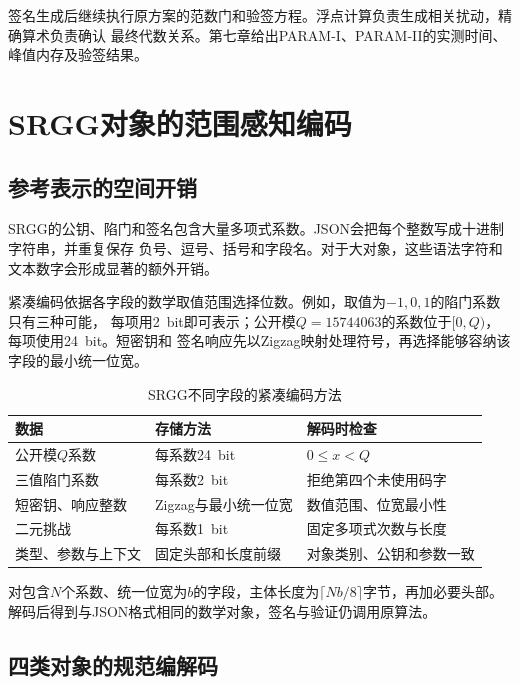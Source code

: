 签名生成后继续执行原方案的范数门和验签方程。浮点计算负责生成相关扰动，精确算术负责确认
最终代数关系。第七章给出PARAM-I、PARAM-II的实测时间、峰值内存及验签结果。

\section{SRGG对象的范围感知编码}
\label{sec:srgg-codec}

\subsection{参考表示的空间开销}

SRGG的公钥、陷门和签名包含大量多项式系数。JSON会把每个整数写成十进制字符串，并重复保存
负号、逗号、括号和字段名。对于大对象，这些语法字符和文本数字会形成显著的额外开销。

紧凑编码依据各字段的数学取值范围选择位数。例如，取值为$-1,0,1$的陷门系数只有三种可能，
每项用2~bit即可表示；公开模$Q=15744063$的系数位于$[0,Q)$，每项使用24~bit。短密钥和
签名响应先以Zigzag映射处理符号，再选择能够容纳该字段的最小统一位宽。

\begin{table}[H]
\centering\small
\caption{SRGG不同字段的紧凑编码方法}
\label{tab:codec-fields}
\begin{tabularx}{\textwidth}{@{}p{}p{}X@{}}
\toprule
\rowcolor{black!8} 数据 & 存储方法 & 解码时检查 \\
\midrule
公开模$Q$系数 & 每系数24~bit & $0\leq x<Q$ \\
三值陷门系数 & 每系数2~bit & 拒绝第四个未使用码字 \\
短密钥、响应整数 & Zigzag与最小统一位宽 & 数值范围、位宽最小性 \\
二元挑战 & 每系数1~bit & 固定多项式次数与长度 \\
类型、参数与上下文 & 固定头部和长度前缀 & 对象类别、公钥和参数一致 \\
\bottomrule
\end{tabularx}
\end{table}

对包含$N$个系数、统一位宽为$b$的字段，主体长度为$\lceil Nb/8\rceil$字节，再加必要头部。
解码后得到与JSON格式相同的数学对象，签名与验证仍调用原算法。

\subsection{四类对象的规范编解码}

